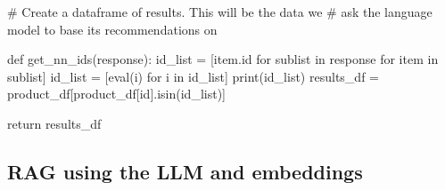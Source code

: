 \documentclass[
  letterpaper,
  DIV=11,
  numbers=noendperiod]{scrreprt}
\newenvironment{Shaded}{\begin{snugshade}}{\end{snugshade}}
\newcommand{\BuiltInTok}[1]{\textcolor[rgb]{0.00,0.23,0.31}{#1}}
\newcommand{\CommentTok}[1]{\textcolor[rgb]{0.37,0.37,0.37}{#1}}
\newcommand{\ControlFlowTok}[1]{\textcolor[rgb]{0.00,0.23,0.31}{#1}}
\newcommand{\KeywordTok}[1]{\textcolor[rgb]{0.00,0.23,0.31}{#1}}
\newcommand{\NormalTok}[1]{\textcolor[rgb]{0.00,0.23,0.31}{#1}}
\newcommand{\OperatorTok}[1]{\textcolor[rgb]{0.37,0.37,0.37}{#1}}
\newcommand{\StringTok}[1]{\textcolor[rgb]{0.13,0.47,0.30}{#1}}
\begin{document}
\begin{Shaded}
\begin{Highlighting}[]
\CommentTok{\# Create a dataframe of results. This will be the data we}
\CommentTok{\# ask the language model to base its recommendations on}

\KeywordTok{def}\NormalTok{ get\_nn\_ids(response):}
\NormalTok{  id\_list }\OperatorTok{=}\NormalTok{ [item.}\BuiltInTok{id} \ControlFlowTok{for}\NormalTok{ sublist }\KeywordTok{in}\NormalTok{ response }\ControlFlowTok{for}\NormalTok{ item }\KeywordTok{in}\NormalTok{ sublist]}
\NormalTok{  id\_list }\OperatorTok{=}\NormalTok{ [}\BuiltInTok{eval}\NormalTok{(i) }\ControlFlowTok{for}\NormalTok{ i }\KeywordTok{in}\NormalTok{ id\_list]}
  \BuiltInTok{print}\NormalTok{(id\_list)}
\NormalTok{  results\_df }\OperatorTok{=}\NormalTok{ product\_df[product\_df[}\StringTok{\textquotesingle{}id\textquotesingle{}}\NormalTok{].isin(id\_list)]}

  \ControlFlowTok{return}\NormalTok{ results\_df}
\end{Highlighting}
\end{Shaded}

\hypertarget{rag-using-the-llm-and-embeddings}{%
\subsection{RAG using the LLM and
embeddings}\label{rag-using-the-llm-and-embeddings}}
\end{document}
